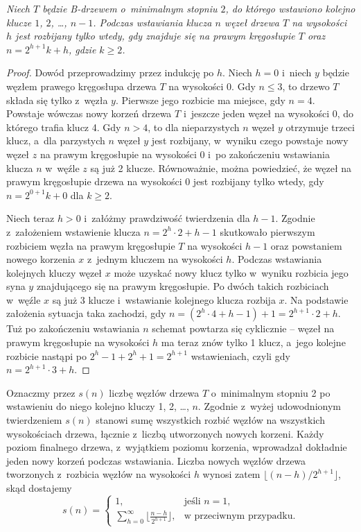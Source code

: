 \medskip
\noindent\textit{Niech\/ $T$ będzie B-drzewem o~minimalnym stopniu\/ $2$, do którego wstawiono kolejno klucze\/ $1$,\/ $2$,\/ \dots,\/ $n-1$.
Podczas wstawiania klucza\/ $n$ węzeł drzewa\/ $T$ na wysokości\/ $h$ jest rozbijany tylko wtedy, gdy znajduje się na prawym kręgosłupie\/ $T$ oraz\/ $n=2^{h+1}k+h$, gdzie\/ $k\ge2$.}
\begin{proof}
	Dowód przeprowadzimy przez indukcję po $h$.
	Niech $h=0$ i~niech $y$ będzie węzłem prawego kręgosłupa drzewa $T$ na wysokości 0.
	Gdy $n\le3$, to drzewo $T$ składa się tylko z~węzła $y$.
	Pierwsze jego rozbicie ma miejsce, gdy $n=4$.
	Powstaje wówczas nowy korzeń drzewa $T$ i~jeszcze jeden węzeł na wysokości 0, do którego trafia klucz 4.
	Gdy $n>4$, to dla nieparzystych $n$ węzeł $y$ otrzymuje trzeci klucz, a~dla parzystych $n$ węzeł $y$ jest rozbijany, w~wyniku czego powstaje nowy węzeł $z$ na prawym kręgosłupie na wysokości 0 i~po zakończeniu wstawiania klucza $n$ w~węźle $z$ są już 2 klucze.
	Równoważnie, można powiedzieć, że węzeł na prawym kręgosłupie drzewa na wysokości 0 jest rozbijany tylko wtedy, gdy $n=2^{0+1}k+0$ dla $k\ge2$.

	Niech teraz $h>0$ i~załóżmy prawdziwość twierdzenia dla $h-1$.
	Zgodnie z~założeniem wstawienie klucza $n=2^h\cdot2+h-1$ skutkowało pierwszym rozbiciem węzła na prawym kręgosłupie $T$ na wysokości $h-1$ oraz powstaniem nowego korzenia $x$ z~jednym kluczem na wysokości $h$.
	Podczas wstawiania kolejnych kluczy węzeł $x$ może uzyskać nowy klucz tylko w~wyniku rozbicia jego syna $y$ znajdującego się na prawym kręgosłupie.
	Po dwóch takich rozbiciach w~węźle $x$ są już 3 klucze i~wstawianie kolejnego klucza rozbija $x$.
	Na podstawie założenia sytuacja taka zachodzi, gdy $n=(2^h\cdot4+h-1)+1=2^{h+1}\cdot2+h$.
	Tuż po zakończeniu wstawiania $n$ schemat powtarza się cyklicznie -- węzeł na prawym kręgosłupie na wysokości $h$ ma teraz znów tylko 1 klucz, a~jego kolejne rozbicie nastąpi po $2^h-1+2^h+1=2^{h+1}$ wstawieniach, czyli gdy $n=2^{h+1}\cdot3+h$.
\end{proof}

Oznaczmy przez $s(n)$ liczbę węzłów drzewa $T$ o~minimalnym stopniu 2 po wstawieniu do niego kolejno kluczy 1, 2, \dots, $n$.
Zgodnie z~wyżej udowodnionym twierdzeniem $s(n)$ stanowi sumę wszystkich rozbić węzłów na wszystkich wysokościach drzewa, łącznie z~liczbą utworzonych nowych korzeni.
Każdy poziom finalnego drzewa, z~wyjątkiem poziomu korzenia, wprowadzał dokładnie jeden nowy korzeń podczas wstawiania.
Liczba nowych węzłów drzewa tworzonych z~rozbicia węzłów na wysokości $h$ wynosi zatem $\lfloor(n-h)/2^{h+1}\rfloor$, skąd dostajemy
\[
	s(n) = \begin{cases}
		1, & \text{jeśli $n=1$}, \\
		\sum_{h=0}^\infty\bigl\lfloor\frac{n-h}{2^{h+1}}\bigr\rfloor, & \text{w~przeciwnym przypadku}.
	\end{cases}
\]

